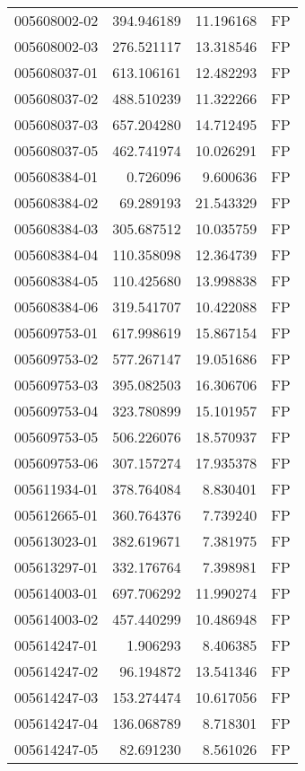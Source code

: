 \begin{tabular}{lrrl}
005608002-02 &  394.946189 &    11.196168 &   FP \\
005608002-03 &  276.521117 &    13.318546 &   FP \\
005608037-01 &  613.106161 &    12.482293 &   FP \\
005608037-02 &  488.510239 &    11.322266 &   FP \\
005608037-03 &  657.204280 &    14.712495 &   FP \\
005608037-05 &  462.741974 &    10.026291 &   FP \\
005608384-01 &    0.726096 &     9.600636 &   FP \\
005608384-02 &   69.289193 &    21.543329 &   FP \\
005608384-03 &  305.687512 &    10.035759 &   FP \\
005608384-04 &  110.358098 &    12.364739 &   FP \\
005608384-05 &  110.425680 &    13.998838 &   FP \\
005608384-06 &  319.541707 &    10.422088 &   FP \\
005609753-01 &  617.998619 &    15.867154 &   FP \\
005609753-02 &  577.267147 &    19.051686 &   FP \\
005609753-03 &  395.082503 &    16.306706 &   FP \\
005609753-04 &  323.780899 &    15.101957 &   FP \\
005609753-05 &  506.226076 &    18.570937 &   FP \\
005609753-06 &  307.157274 &    17.935378 &   FP \\
005611934-01 &  378.764084 &     8.830401 &   FP \\
005612665-01 &  360.764376 &     7.739240 &   FP \\
005613023-01 &  382.619671 &     7.381975 &   FP \\
005613297-01 &  332.176764 &     7.398981 &   FP \\
005614003-01 &  697.706292 &    11.990274 &   FP \\
005614003-02 &  457.440299 &    10.486948 &   FP \\
005614247-01 &    1.906293 &     8.406385 &   FP \\
005614247-02 &   96.194872 &    13.541346 &   FP \\
005614247-03 &  153.274474 &    10.617056 &   FP \\
005614247-04 &  136.068789 &     8.718301 &   FP \\
005614247-05 &   82.691230 &     8.561026 &   FP \\

\end{tabular}
